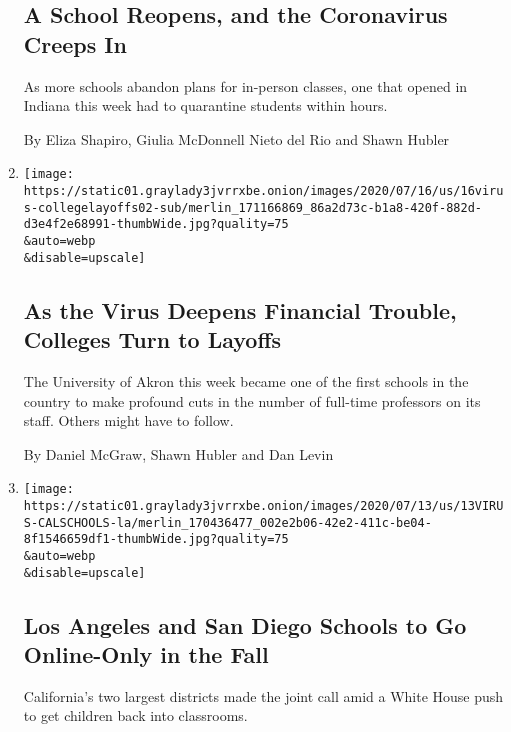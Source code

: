 \begin{enumerate}
{  \subsection{A School Reopens, and the Coronavirus Creeps
  In}\label{a-school-reopens-and-the-coronavirus-creeps-in}}

  As more schools abandon plans for in-person classes, one that opened
  in Indiana this week had to quarantine students within hours.

  By Eliza Shapiro, Giulia McDonnell Nieto del Rio and Shawn Hubler
\item
  \href{/2020/07/16/us/coronavirus-college-faculty-layoffs.html}{}

  \texttt{[image: https://static01.graylady3jvrrxbe.onion/images/2020/07/16/us/16virus-collegelayoffs02-sub/merlin\_171166869\_86a2d73c-b1a8-420f-882d-d3e4f2e68991-thumbWide.jpg?quality=75\\\&auto=webp\\\&disable=upscale]}

  \hypertarget{as-the-virus-deepens-financial-trouble-colleges-turn-to-layoffs}{%
  \subsection{As the Virus Deepens Financial Trouble, Colleges Turn to
  Layoffs}\label{as-the-virus-deepens-financial-trouble-colleges-turn-to-layoffs}}

  The University of Akron this week became one of the first schools in
  the country to make profound cuts in the number of full-time
  professors on its staff. Others might have to follow.

  By Daniel McGraw, Shawn Hubler and Dan Levin
\item
  \href{/2020/07/13/us/lausd-san-diego-school-reopening.html}{}

  \texttt{[image: https://static01.graylady3jvrrxbe.onion/images/2020/07/13/us/13VIRUS-CALSCHOOLS-la/merlin\_170436477\_002e2b06-42e2-411c-be04-8f1546659df1-thumbWide.jpg?quality=75\\\&auto=webp\\\&disable=upscale]}

  \hypertarget{los-angeles-and-san-diego-schools-to-go-online-only-in-the-fall}{%
  \subsection{Los Angeles and San Diego Schools to Go Online-Only in the
  Fall}\label{los-angeles-and-san-diego-schools-to-go-online-only-in-the-fall}}

  California's two largest districts made the joint call amid a White
  House push to get children back into classrooms.


\end{enumerate}
